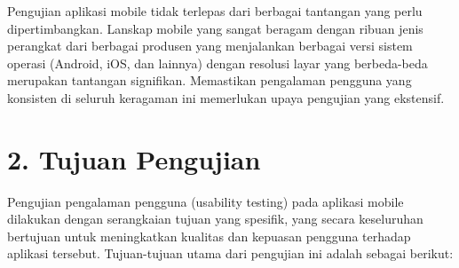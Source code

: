 Pengujian aplikasi mobile tidak terlepas dari berbagai tantangan yang perlu dipertimbangkan. Lanskap mobile yang sangat beragam dengan ribuan jenis perangkat dari berbagai produsen yang menjalankan berbagai versi sistem operasi (Android, iOS, dan lainnya) dengan resolusi layar yang berbeda-beda merupakan tantangan signifikan. Memastikan pengalaman pengguna yang konsisten di seluruh keragaman ini memerlukan upaya pengujian yang ekstensif.

\section*{2. Tujuan Pengujian}
Pengujian pengalaman pengguna (usability testing) pada aplikasi mobile dilakukan dengan serangkaian tujuan yang spesifik, yang secara keseluruhan bertujuan untuk meningkatkan kualitas dan kepuasan pengguna terhadap aplikasi tersebut. Tujuan-tujuan utama dari pengujian ini adalah sebagai berikut:
